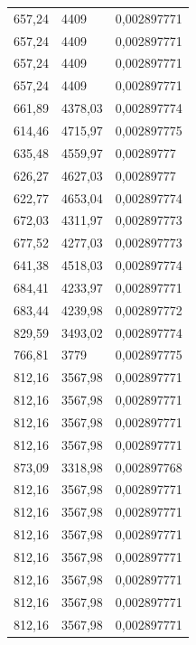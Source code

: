 \begin{center}
\begin{longtable}{|l|l|l|}
657,24            & 4409              & 0,002897771 \\
657,24            & 4409              & 0,002897771 \\
657,24            & 4409              & 0,002897771 \\
657,24            & 4409              & 0,002897771 \\
661,89            & 4378,03           & 0,002897774 \\
614,46            & 4715,97           & 0,002897775 \\
635,48            & 4559,97           & 0,00289777  \\
626,27            & 4627,03           & 0,00289777  \\
622,77            & 4653,04           & 0,002897774 \\
672,03            & 4311,97           & 0,002897773 \\
677,52            & 4277,03           & 0,002897773 \\
641,38            & 4518,03           & 0,002897774 \\
684,41            & 4233,97           & 0,002897771 \\
683,44            & 4239,98           & 0,002897772 \\
829,59            & 3493,02           & 0,002897774 \\
766,81            & 3779              & 0,002897775 \\
812,16            & 3567,98           & 0,002897771 \\
812,16            & 3567,98           & 0,002897771 \\
812,16            & 3567,98           & 0,002897771 \\
812,16            & 3567,98           & 0,002897771 \\
873,09            & 3318,98           & 0,002897768 \\
812,16            & 3567,98           & 0,002897771 \\
812,16            & 3567,98           & 0,002897771 \\
812,16            & 3567,98           & 0,002897771 \\
812,16            & 3567,98           & 0,002897771 \\
812,16            & 3567,98           & 0,002897771 \\
812,16            & 3567,98           & 0,002897771 \\
812,16            & 3567,98           & 0,002897771 \\

\end{longtable}
\end{center}

